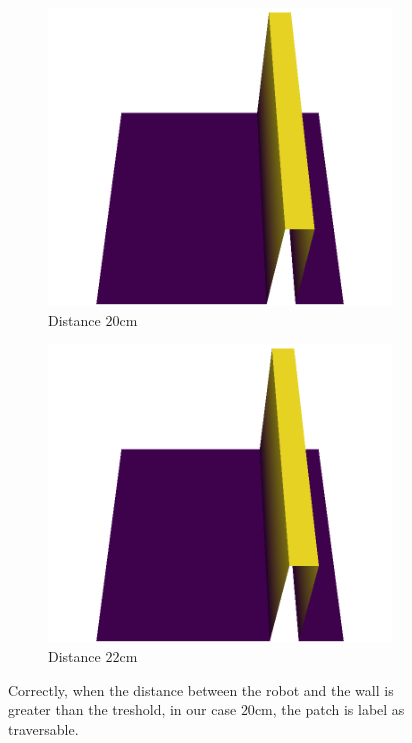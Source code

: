 \documentclass[../document.tex]{subfiles}
\begin{document}
\begin{figure} [htbp]
\begin{subfigure}[b]{0.33\textwidth}
    \end{subfigure}   \\
    \begin{subfigure}[b]{0.33\textwidth}
        \includegraphics[width=\linewidth]{../img/5/custom_patches/walls_front/2-3d.png}
        \caption{Distance $20$cm}
    \label{fig: walls-traversable-a}
    \end{subfigure}   
    \begin{subfigure}[b]{0.33\textwidth}
        \includegraphics[width=\linewidth]{../img/5/custom_patches/walls_front/1-3d.png}
        \caption{Distance $22$cm}
    \label{fig: walls-traversable-b}
    \end{subfigure}   
    \caption{Correctly, when the distance between the robot and the wall is greater than the  treshold, in our case $20$cm, the patch is label as traversable.}
    \label{fig: walls-traversable}
\end{figure}
\end{document}
